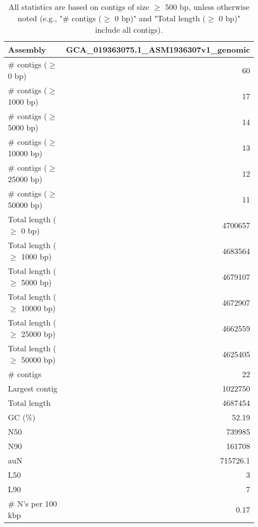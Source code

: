 \documentclass[12pt,a4paper]{article}
\begin{document}
\begin{table}[ht]
\begin{center}
\caption{All statistics are based on contigs of size $\geq$ 500 bp, unless otherwise noted (e.g., "\# contigs ($\geq$ 0 bp)" and "Total length ($\geq$ 0 bp)" include all contigs).}
\begin{tabular}{|l*{1}{|r}|}
\hline
Assembly & GCA\_019363075.1\_ASM1936307v1\_genomic \\ \hline
\# contigs ($\geq$ 0 bp) & 60 \\ \hline
\# contigs ($\geq$ 1000 bp) & 17 \\ \hline
\# contigs ($\geq$ 5000 bp) & 14 \\ \hline
\# contigs ($\geq$ 10000 bp) & 13 \\ \hline
\# contigs ($\geq$ 25000 bp) & 12 \\ \hline
\# contigs ($\geq$ 50000 bp) & 11 \\ \hline
Total length ($\geq$ 0 bp) & 4700657 \\ \hline
Total length ($\geq$ 1000 bp) & 4683564 \\ \hline
Total length ($\geq$ 5000 bp) & 4679107 \\ \hline
Total length ($\geq$ 10000 bp) & 4672907 \\ \hline
Total length ($\geq$ 25000 bp) & 4662559 \\ \hline
Total length ($\geq$ 50000 bp) & 4625405 \\ \hline
\# contigs & 22 \\ \hline
Largest contig & 1022750 \\ \hline
Total length & 4687454 \\ \hline
GC (\%) & 52.19 \\ \hline
N50 & 739985 \\ \hline
N90 & 161708 \\ \hline
auN & 715726.1 \\ \hline
L50 & 3 \\ \hline
L90 & 7 \\ \hline
\# N's per 100 kbp & 0.17 \\ \hline
\end{tabular}
\end{center}
\end{table}
\end{document}
